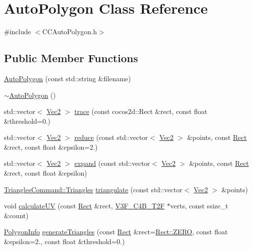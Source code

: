 \hypertarget{classAutoPolygon}{}\section{Auto\+Polygon Class Reference}
\label{classAutoPolygon}


{\ttfamily \#include $<$C\+C\+Auto\+Polygon.\+h$>$}

\subsection*{Public Member Functions}
\begin{DoxyCompactItemize}
\item 
\hyperlink{group____2d_gaa74351ac8f735344958e7b2ac8363bb5}{Auto\+Polygon} (const std\+::string \&filename)
\item 
\hyperlink{group____2d_gaca856dfbfddcb64d3fa29bf261dd10f8}{$\sim$\+Auto\+Polygon} ()
\item 
std\+::vector$<$ \hyperlink{classVec2}{Vec2} $>$ \hyperlink{group____2d_gad9ffba6df684ed89dbed2173e66f2969}{trace} (const cocos2d\+::\+Rect \&rect, const float \&threshold=0.)
\item 
std\+::vector$<$ \hyperlink{classVec2}{Vec2} $>$ \hyperlink{group____2d_ga21c47c22ffc43bb0157be9b3be01f56b}{reduce} (const std\+::vector$<$ \hyperlink{classVec2}{Vec2} $>$ \&points, const \hyperlink{classRect}{Rect} \&rect, const float \&epsilon=2.)
\item 
std\+::vector$<$ \hyperlink{classVec2}{Vec2} $>$ \hyperlink{group____2d_ga13908bb1049ebcda0cdc63c7d6959ae6}{expand} (const std\+::vector$<$ \hyperlink{classVec2}{Vec2} $>$ \&points, const \hyperlink{classRect}{Rect} \&rect, const float \&epsilon)
\item 
\hyperlink{structTrianglesCommand_1_1Triangles}{Triangles\+Command\+::\+Triangles} \hyperlink{group____2d_ga0ee3e7e22fdf9982ec084191928caffa}{triangulate} (const std\+::vector$<$ \hyperlink{classVec2}{Vec2} $>$ \&points)
\item 
void \hyperlink{group____2d_gab4db69f4d34a6f61c4a71590043056da}{calculate\+UV} (const \hyperlink{classRect}{Rect} \&rect, \hyperlink{structV3F__C4B__T2F}{V3\+F\+\_\+\+C4\+B\+\_\+\+T2F} $\ast$verts, const ssize\+\_\+t \&count)
\item 
\hyperlink{classPolygonInfo}{Polygon\+Info} \hyperlink{group____2d_gad8b3406e33de529b8aa6571a87f3c2b9}{generate\+Triangles} (const \hyperlink{classRect}{Rect} \&rect=\hyperlink{classRect_a590be46e60027b2ca0f62a457f91a83e}{Rect\+::\+Z\+E\+RO}, const float \&epsilon=2., const float \&threshold=0.)

\end{DoxyCompactItemize}
